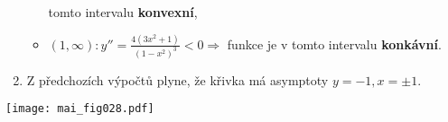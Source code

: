 \begin{example}
\begin{enumerate}
\begin{itemize}
                 tomto intervalu \textbf{konvexní},
           \item $(1,\infty): y''=\frac{4(3x^2+1)}{(1-x^2 )^3} <0 \Rightarrow$ funkce je v tomto  
                 intervalu \textbf{konkáv\-ní}.
         \end{itemize}
    \item Z předchozích výpočtů plyne, že křivka má asymptoty $y=-1,x=\pm1$.
  \end{enumerate}
   {\centering
    \captionsetup{type=figure}          %
    \texttt{[image: mai\_fig028.pdf]}
    \label{MAI:fig_028}
  \par}
\end{example}